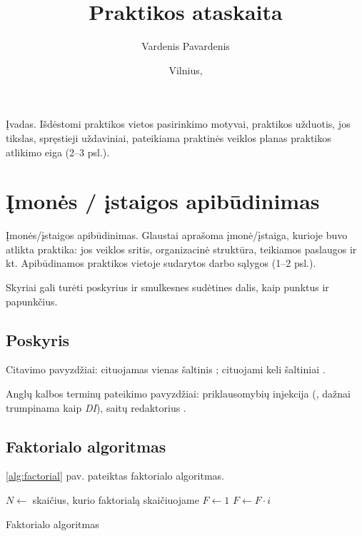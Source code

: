 \documentclass{VUMIFPSBakPrakAt}
\title{Praktikos ataskaita}
\author{Vardenis Pavardenis}
\date{Vilnius, \the\year}
\begin{document}
\maketitle

\tableofcontents

Įvadas. Išdėstomi praktikos vietos pasirinkimo motyvai, praktikos užduotis, jos tikslas, spręstieji
uždaviniai, pateikiama praktinės veiklos planas praktikos atlikimo eiga (2--3 psl.).

\section{Įmonės / įstaigos apibūdinimas}
Įmonės/įstaigos apibūdinimas. Glaustai aprašoma įmonė/įstaiga, kurioje buvo atlikta praktika: jos
veiklos sritis, organizacinė struktūra, teikiamos paslaugos ir kt. Apibūdinamos praktikos vietoje
sudarytos darbo sąlygos (1--2 psl.).

Skyriai gali turėti poskyrius ir smulkesnes sudėtines dalis, kaip punktus ir
papunkčius.

\subsection{Poskyris}
Citavimo pavyzdžiai: cituojamas vienas šaltinis \cite{PvzStraipsnLt}; cituojami
keli šaltiniai \cite{PvzStraipsnEn, PvzKonfLt, PvzKonfEn, PvzKnygLt, PvzKnygEn,
PvzElPubLt, PvzElPubEn, PvzBakLt, PvzMagistrLt, PvzPhdEn}.

Anglų kalbos terminų pateikimo pavyzdžiai: priklausomybių injekcija (,
dažnai trumpinama kaip \textit{DI}), saitų redaktorius .

\subsection{Faktorialo algoritmas}

\ref{alg:factorial} pav. pateiktas faktorialo algoritmas.

\begin{algorithm}
\begin{algorithmic}[1] %
\State $N\gets$ skaičius, kurio faktorialą skaičiuojame
\State $F\gets 1$
    \State $F\gets F \cdot i$
\EndFor
\end{algorithmic}
\caption{Faktorialo algoritmas}
\label{alg:factorial}
\end{algorithm}
\end{document}

